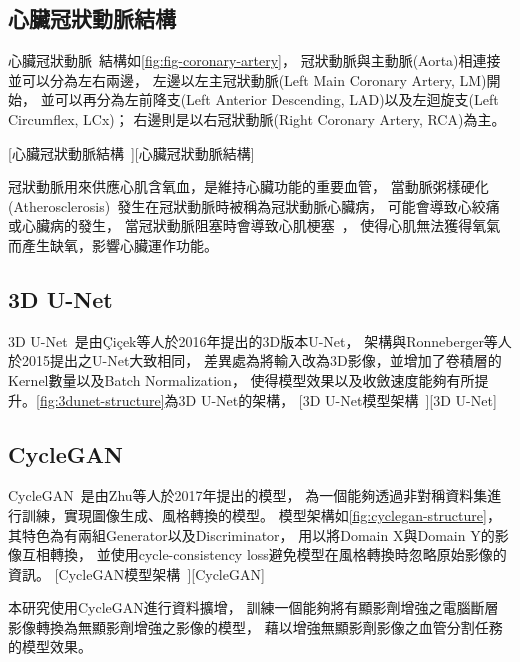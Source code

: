 \documentclass[class=NCU_thesis, crop=false]{standalone}
\begin{document}
\subsection{心臟冠狀動脈結構}
心臟冠狀動脈~\cite{ogobuiroAnatomyThoraxHeart2021, rehmanPhysiologyCoronaryCirculation2021}結構如\cref{fig:fig-coronary-artery}，
冠狀動脈與主動脈(Aorta)相連接並可以分為左右兩邊，
左邊以左主冠狀動脈(Left Main Coronary Artery, LM)開始，
並可以再分為左前降支(Left Anterior Descending, LAD)以及左迴旋支(Left Circumflex, LCx)；
右邊則是以右冠狀動脈(Right Coronary Artery, RCA)為主。

[心臟冠狀動脈結構~\cite{ogobuiroAnatomyThoraxHeart2021}][心臟冠狀動脈結構]

冠狀動脈用來供應心肌含氧血，是維持心臟功能的重要血管，
當動脈粥樣硬化(Atherosclerosis)~\cite{AtherosclerosisAmericanHeart, AtherosclerosisNHLBINIH}發生在冠狀動脈時被稱為冠狀動脈心臟病，
可能會導致心絞痛或心臟病的發生，
當冠狀動脈阻塞時會導致心肌梗塞~\cite{ojhaMyocardialInfarction2021}，
使得心肌無法獲得氧氣而產生缺氧，影響心臟運作功能。

\subsection{3D U-Net}
3D U-Net~\cite{cicek3DUNetLearning2016}是由Çiçek等人於2016年提出的3D版本U-Net，
架構與Ronneberger等人於2015提出之U-Net大致相同，
差異處為將輸入改為3D影像，並增加了卷積層的Kernel數量以及Batch Normalization，
使得模型效果以及收斂速度能夠有所提升。\cref{fig:3dunet-structure}為3D U-Net的架構，
[3D U-Net模型架構~\cite{cicek3DUNetLearning2016}][3D U-Net]

\subsection{CycleGAN}
CycleGAN~\cite{zhuUnpairedImagetoImageTranslation2017}是由Zhu等人於2017年提出的模型，
為一個能夠透過非對稱資料集進行訓練，實現圖像生成、風格轉換的模型。
模型架構如\cref{fig:cyclegan-structure}，
其特色為有兩組Generator以及Discriminator，
用以將Domain X與Domain Y的影像互相轉換，
並使用cycle-consistency loss避免模型在風格轉換時忽略原始影像的資訊。
[CycleGAN模型架構~\cite{zhuUnpairedImagetoImageTranslation2017}][CycleGAN]

本研究使用CycleGAN進行資料擴增，
訓練一個能夠將有顯影劑增強之電腦斷層影像轉換為無顯影劑增強之影像的模型，
藉以增強無顯影劑影像之血管分割任務的模型效果。
\end{document}
